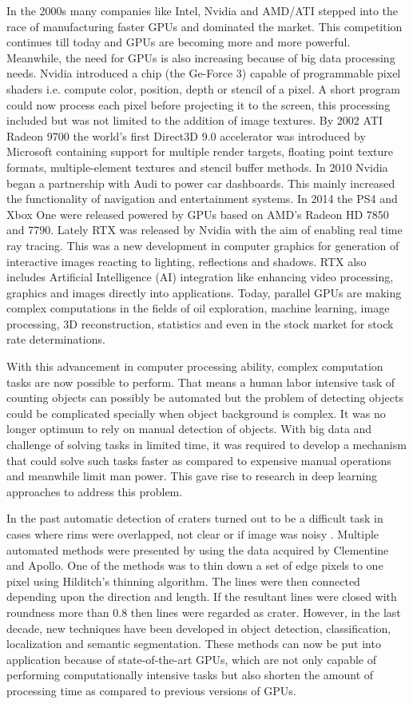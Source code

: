 \documentclass[11pt]{article}
\begin{document}
In the 2000s many companies like Intel, Nvidia and AMD/ATI stepped into the race of manufacturing faster GPUs and dominated the market. This competition continues till today and GPUs are becoming more and more powerful. Meanwhile, the need for GPUs is also increasing because of big data processing needs. Nvidia introduced a chip (the Ge-Force 3) capable of programmable pixel shaders i.e. compute color, position, depth or stencil of a pixel. A short program could now process each pixel before projecting it to the screen, this processing included but was not limited to the addition of image textures. By 2002 ATI Radeon 9700 the world's first Direct3D 9.0 accelerator was introduced by Microsoft containing support for multiple render targets, floating point texture formats, multiple-element textures and stencil buffer methods. In 2010 Nvidia began a partnership with Audi to power car dashboards. This mainly increased the functionality of navigation and entertainment systems. In 2014 the PS4 and Xbox One were released powered by GPUs based on AMD's Radeon HD 7850 and 7790. Lately RTX was released by Nvidia with the aim of enabling real time ray tracing. This was a new development in computer graphics for generation of interactive images reacting to lighting, reflections and shadows. RTX also includes Artificial Intelligence (AI) integration like enhancing video processing, graphics and images directly into applications. Today, parallel GPUs are making complex computations in the fields of oil exploration, machine learning, image processing, 3D reconstruction, statistics and even in the stock market for stock rate determinations.

With this advancement in computer processing ability, complex computation tasks are now possible to perform. That means a human labor intensive task of counting objects can possibly be automated but the problem of detecting objects could be complicated specially when object background is complex. It was no longer optimum to rely on manual detection of objects. With big data and challenge of solving tasks in limited time, it was required to develop a mechanism that could solve such tasks faster as compared to expensive manual operations and meanwhile limit man power. This gave rise to research in deep learning approaches to address this problem.

In the past automatic detection of craters turned out to be a difficult task in cases where rims were overlapped, not clear or if image was noisy \cite{sawabe_2006}. Multiple automated methods were presented by \cite{sawabe_2006} using the data acquired by Clementine and Apollo. One of the methods was to thin down a set of edge pixels to one pixel using Hilditch's thinning algorithm. The lines were then connected depending upon the direction and length. If the resultant lines were closed with roundness more than 0.8 then lines were regarded as crater. However, in the last decade, new techniques have been developed in object detection, classification, localization and semantic segmentation. These methods can now be put into application because of state-of-the-art GPUs, which are not only capable of performing computationally intensive tasks but also shorten the amount of processing time as compared to previous versions of GPUs.
\end{document}
